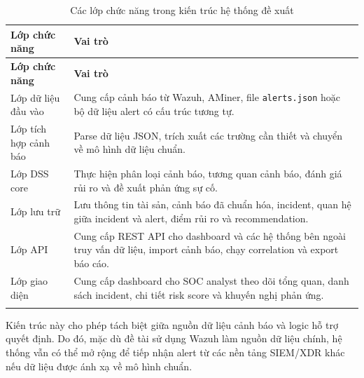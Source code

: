 \documentclass[a4paper,12pt,oneside]{book}
\begin{document}
{\begin{longtable}{|L{3.9cm}|L{10.4cm}|}
\hline
\textbf{Lớp chức năng} & \textbf{Vai trò} \\
\hline
\endfirsthead
\hline
\textbf{Lớp chức năng} & \textbf{Vai trò} \\
\hline
\endhead
Lớp dữ liệu đầu vào & Cung cấp cảnh báo từ Wazuh, AMiner, file \texttt{alerts.json} hoặc bộ dữ liệu alert có cấu trúc tương tự. \\
\hline
Lớp tích hợp cảnh báo & Parse dữ liệu JSON, trích xuất các trường cần thiết và chuyển về mô hình dữ liệu chuẩn. \\
\hline
Lớp DSS core & Thực hiện phân loại cảnh báo, tương quan cảnh báo, đánh giá rủi ro và đề xuất phản ứng sự cố. \\
\hline
Lớp lưu trữ & Lưu thông tin tài sản, cảnh báo đã chuẩn hóa, incident, quan hệ giữa incident và alert, điểm rủi ro và recommendation. \\
\hline
Lớp API & Cung cấp REST API cho dashboard và các hệ thống bên ngoài truy vấn dữ liệu, import cảnh báo, chạy correlation và export báo cáo. \\
\hline
Lớp giao diện & Cung cấp dashboard cho SOC analyst theo dõi tổng quan, danh sách incident, chi tiết risk score và khuyến nghị phản ứng. \\
\hline
\caption{Các lớp chức năng trong kiến trúc hệ thống đề xuất}\\
\end{longtable}

\noindent Kiến trúc này cho phép tách biệt giữa nguồn dữ liệu cảnh báo và logic hỗ trợ quyết định. Do đó, mặc dù đề tài sử dụng Wazuh làm nguồn dữ liệu chính, hệ thống vẫn có thể mở rộng để tiếp nhận alert từ các nền tảng SIEM/XDR khác nếu dữ liệu được ánh xạ về mô hình chuẩn.

}
\end{document}
